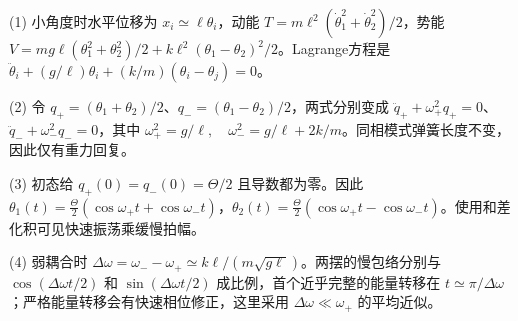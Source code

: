 (1) 小角度时水平位移为 \(x_i\simeq\ell\theta_i\)，动能 \(T=m\ell^2(\dot\theta_1^2+\dot\theta_2^2)/2\)，势能 \(V=mg\ell(\theta_1^2+\theta_2^2)/2+k\ell^2(\theta_1-\theta_2)^2/2\)。Lagrange方程是 \(\ddot\theta_i+(g/\ell)\theta_i+(k/m)(\theta_i-\theta_j)=0\)。

(2) 令 \(q_+=(\theta_1+\theta_2)/2\)、\(q_-=(\theta_1-\theta_2)/2\)，两式分别变成 \(\ddot q_++\omega_+^2q_+=0\)、\(\ddot q_-+\omega_-^2q_-=0\)，其中 \(\boxed{\omega_+^2=g/\ell,\quad\omega_-^2=g/\ell+2k/m}\)。同相模式弹簧长度不变，因此仅有重力回复。

(3) 初态给 \(q_+(0)=q_-(0)=\Theta/2\) 且导数都为零。因此 \(\boxed{\theta_1(t)=\frac\Theta2(\cos\omega_+t+\cos\omega_-t)}\)，\(\boxed{\theta_2(t)=\frac\Theta2(\cos\omega_+t-\cos\omega_-t)}\)。使用和差化积可见快速振荡乘缓慢拍幅。

(4) 弱耦合时 \(\Delta\omega=\omega_--\omega_+\simeq k\ell/(m\sqrt{g\ell})\)。两摆的慢包络分别与 \(\cos(\Delta\omega t/2)\) 和 \(\sin(\Delta\omega t/2)\) 成比例，首个近乎完整的能量转移在 \(\boxed{t\simeq\pi/\Delta\omega}\)；严格能量转移会有快速相位修正，这里采用 \(\Delta\omega\ll\omega_+\) 的平均近似。
